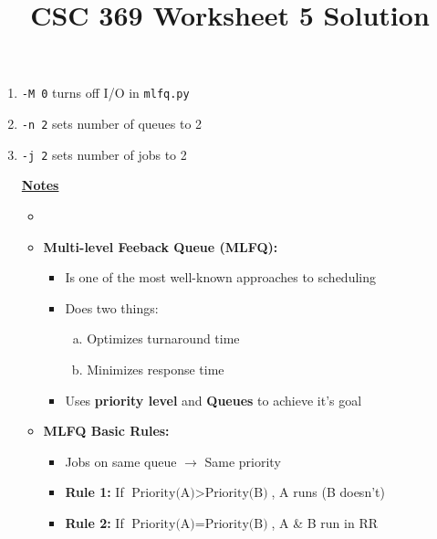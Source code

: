 \documentclass[12pt]{article}
\begin{document}
\title{CSC 369 Worksheet 5 Solution}
\maketitle

\bigskip

\begin{enumerate}[1.]
    \item \texttt{-M 0} turns off I/O in \texttt{mlfq.py}
    \item \texttt{-n 2} sets number of queues to 2
    \item \texttt{-j 2} sets number of jobs to 2

    \bigskip

    \underline{\textbf{Notes}}

    \begin{itemize}
        \item
        \item \textbf{Multi-level Feeback Queue (MLFQ):}

        \begin{itemize}
            \item Is one of the most well-known approaches to scheduling
            \item Does two things:

            \begin{enumerate}[a)]
                \item Optimizes turnaround time
                \item Minimizes response time
            \end{enumerate}

            \item Uses \textbf{priority level} and \textbf{Queues} to achieve it's goal
        \end{itemize}

        \item \textbf{MLFQ Basic Rules:}
        \begin{itemize}
            \item Jobs on same queue $\to$ Same priority
            \item \textbf{Rule 1:} If $\text{Priority(A)} > \text{Priority(B)}$, A runs (B doesn't)
            \item \textbf{Rule 2:} If $\text{Priority(A)} = \text{Priority(B)}$, A \& B run in RR
        \end{itemize}

        \bigskip


\end{itemize}
\end{enumerate}
\end{document}
